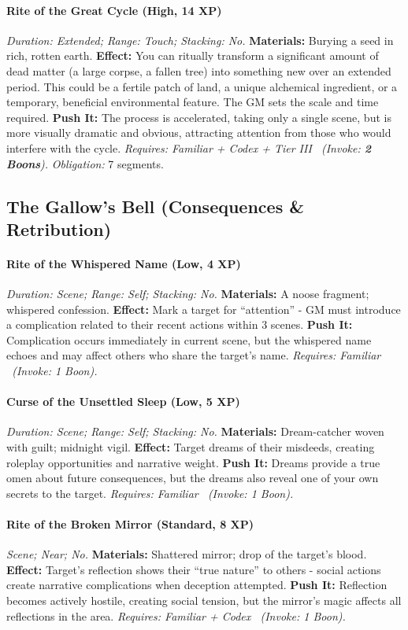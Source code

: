 \paragraph{Rite of the Great Cycle (High, 14 XP)} \emph{Duration: Extended; Range: Touch; Stacking: No.}
\textbf{Materials:} Burying a seed in rich, rotten earth.
\textbf{Effect:} You can ritually transform a significant amount of dead matter (a large corpse, a fallen tree) into something new over an extended period. This could be a fertile patch of land, a unique alchemical ingredient, or a temporary, beneficial environmental feature. The GM sets the scale and time required.
\textbf{Push It:} The process is accelerated, taking only a single scene, but is more visually dramatic and obvious, attracting attention from those who would interfere with the cycle.
\emph{Requires: Familiar + Codex + Tier III \ (\textit{Invoke:} \textbf{2 Boons}).}
\emph{Obligation:} 7 segments.

\subsection{The Gallow's Bell (Consequences \& Retribution)}
\paragraph{Rite of the Whispered Name (Low, 4 XP)} \emph{Duration: Scene; Range: Self; Stacking: No.}
\textbf{Materials:} A noose fragment; whispered confession.
\textbf{Effect:} Mark a target for ``attention'' - GM must introduce a complication related to their recent actions within 3 scenes.
\textbf{Push It:} Complication occurs immediately in current scene, but the whispered name echoes and may affect others who share the target's name.
\emph{Requires: Familiar \ (\textit{Invoke:} 1 Boon).}
\paragraph{Curse of the Unsettled Sleep (Low, 5 XP)} \emph{Duration: Scene; Range: Self; Stacking: No.}
\textbf{Materials:} Dream-catcher woven with guilt; midnight vigil.
\textbf{Effect:} Target dreams of their misdeeds, creating roleplay opportunities and narrative weight.
\textbf{Push It:} Dreams provide a true omen about future consequences, but the dreams also reveal one of your own secrets to the target.
\emph{Requires: Familiar \ (\textit{Invoke:} 1 Boon).}
\paragraph{Rite of the Broken Mirror (Standard, 8 XP)} \emph{Scene; Near; No.}
\textbf{Materials:} Shattered mirror; drop of the target's blood.
\textbf{Effect:} Target's reflection shows their ``true nature'' to others - social actions create narrative complications when deception attempted.
\textbf{Push It:} Reflection becomes actively hostile, creating social tension, but the mirror's magic affects all reflections in the area.
\emph{Requires: Familiar + Codex \ (\textit{Invoke:} 1 Boon).}
